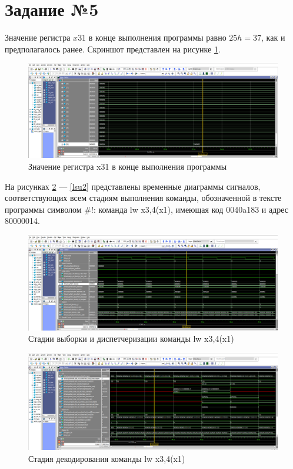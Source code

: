 \section{Задание №5}

Значение регистра $x31$ в конце выполнения программы равно $25h = 37$, как и предполагалось ранее. Скриншот представлен на рисунке \ref{resx31}.

\begin{figure}[h!p]
	\centering
	\includegraphics[width = \linewidth]{../img/resx31.png}
	\caption{Значение регистра x31 в конце выполнения программы}
	\label{resx31}
\end{figure}

На рисунках \ref{fid2} --- \ref{lsu2} представлены временные диаграммы сигналов, соответствующих всем стадиям выполнения команды, обозначенной в тексте программы символом \#!: команда lw x3,4(x1), имеющая код 0040a183 и адрес 80000014.

\begin{figure}[h!p]
	\centering
	\includegraphics[width = \linewidth]{../img/fid2.png}
	\caption{Стадии выборки и диспетчеризации команды lw x3,4(x1)}
	\label{fid2}
\end{figure}

\begin{figure}[h!p]
	\centering
	\includegraphics[width = \linewidth]{../img/decode2.png}
	\caption{Стадия декодирования команды lw x3,4(x1)}
	\label{decode2}
\end{figure}

